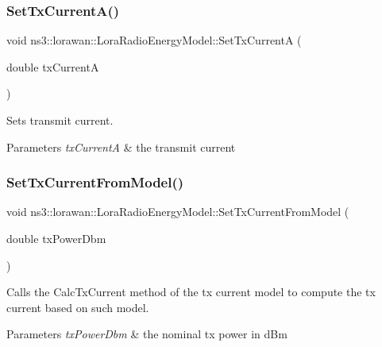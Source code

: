 \subsubsection{\texorpdfstring{Set\+Tx\+Current\+A()}{SetTxCurrentA()}}
{\footnotesize\ttfamily void ns3\+::lorawan\+::\+Lora\+Radio\+Energy\+Model\+::\+Set\+Tx\+CurrentA (\begin{DoxyParamCaption}\item[{double}]{tx\+CurrentA }\end{DoxyParamCaption})}



Sets transmit current. 


\begin{DoxyParams}{Parameters}
{\em tx\+CurrentA} & the transmit current \\
\hline
\end{DoxyParams}
\mbox{\label{classns3_1_1lorawan_1_1LoraRadioEnergyModel_a4a2460272aa7dc8048e7b3a9360f675c}} 
\subsubsection{\texorpdfstring{Set\+Tx\+Current\+From\+Model()}{SetTxCurrentFromModel()}}
{\footnotesize\ttfamily void ns3\+::lorawan\+::\+Lora\+Radio\+Energy\+Model\+::\+Set\+Tx\+Current\+From\+Model (\begin{DoxyParamCaption}\item[{double}]{tx\+Power\+Dbm }\end{DoxyParamCaption})}



Calls the Calc\+Tx\+Current method of the tx current model to compute the tx current based on such model. 


\begin{DoxyParams}{Parameters}
{\em tx\+Power\+Dbm} & the nominal tx power in d\+Bm \\
\hline
\end{DoxyParams}
\mbox{\label{classns3_1_1lorawan_1_1LoraRadioEnergyModel_ae9478485a13a8c582009c0aab0b66796}} 
